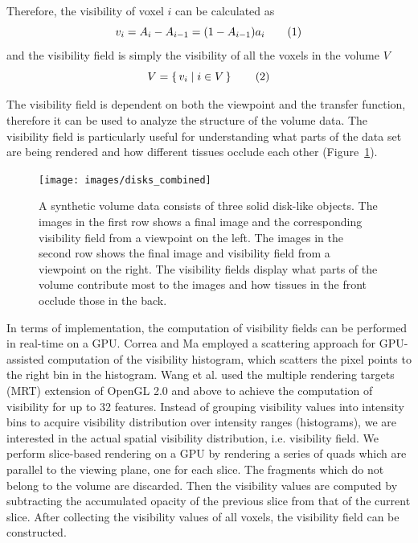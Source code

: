 Therefore, the visibility of voxel $ i $ can be calculated as
\[ v_{i}=A_{i}-A_{i-1}=(1-A_{i-1})a_{i} 
\addtag \]
and the visibility field is simply the visibility of all the voxels in the volume $ V $
\[ V=\set{v_{i}|i \in V} 
\addtag \]

The visibility field is dependent on both the viewpoint and the transfer function, therefore it can be used to analyze the structure of the volume data. The visibility field is particularly useful for understanding what parts of the data set are being rendered and how different tissues occlude each other (Figure~\ref{fig:disks_combined}).

\begin{figure}
	\centering
	\texttt{[image: images/disks\_combined]}
	\caption{A synthetic volume data consists of three solid disk-like objects. The images in the first row shows a final image and the corresponding visibility field from a viewpoint on the left.
		The images in the second row shows the final image and visibility field from a viewpoint on the right.
		The visibility fields display what parts of the volume contribute most to the images and how tissues in the front occlude those in the back.}
	\label{fig:disks_combined}
\end{figure}

In terms of implementation, the computation of visibility fields can be performed in real-time on a GPU.
Correa and Ma \cite{correa_visibility_2011} employed a scattering approach for GPU-assisted computation of the visibility histogram, which scatters the pixel points to the right bin in the histogram. Wang et al. \cite{wang_efficient_2011} used the multiple rendering targets (MRT) extension of OpenGL 2.0 and above to achieve the computation of visibility for up to 32 features.
Instead of grouping visibility values into intensity bins to acquire visibility distribution over intensity ranges (histograms), we are interested in the actual spatial visibility distribution, i.e. visibility field. We perform slice-based rendering on a GPU by rendering a series of quads which are parallel to the viewing plane, one for each slice. The fragments which do not belong to the volume are discarded. Then the visibility values are computed by subtracting the accumulated opacity of the previous slice from that of the current slice. After collecting the visibility values of all voxels, the visibility field can be constructed.


